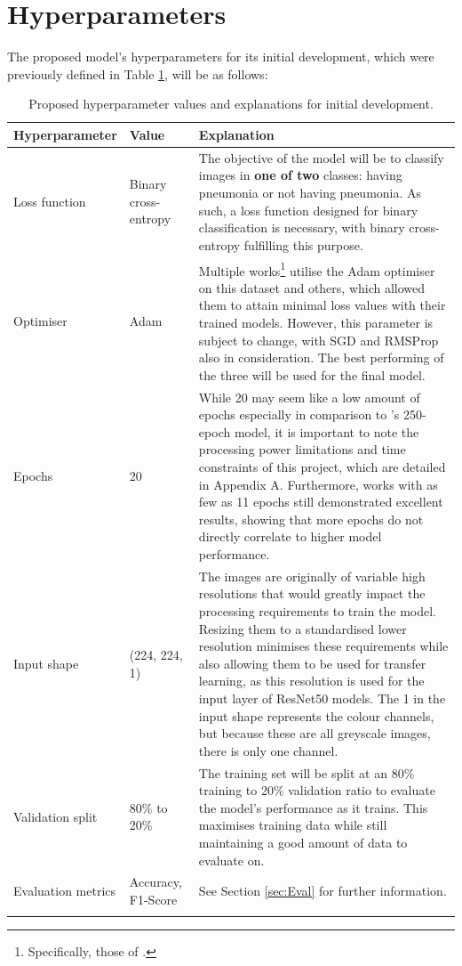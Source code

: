\documentclass[12pt]{report}
\begin{document}
\section{Hyperparameters}
The proposed model's hyperparameters for its initial development, which were previously defined in Table \ref{tab:Hyperparameters}, 
will be as follows:

\begin{longtable}{ | p{} | p{} | p{} | }
    \hline
    \cellcolor{blue!25} Hyperparameter & \cellcolor{blue!25} Value & \cellcolor{blue!25} Explanation \\
    \hline
    Loss function & Binary cross-entropy & The objective of the model will be to classify images in \textbf{one of two} classes: 
    having pneumonia or not having pneumonia. As such, a loss function designed for binary classification is necessary,
    with binary cross-entropy fulfilling this purpose. \\
    \hline
    Optimiser & Adam & Multiple works\footnote{Specifically, those of \textcite{malikCDC_NetMulticlassificationConvolutional2023a,elasnaouiDesignEnsembleDeep2021a}.} utilise the Adam optimiser on this dataset and others, which allowed them to attain 
    minimal loss values with their trained models. However, this parameter is subject to change, with SGD and RMSProp also in 
    consideration. The best performing of the three will be used for the final model. \\
    \hline 
    Epochs & 20 & While 20 may seem like a low amount of epochs especially in comparison to \textcite{elasnaouiDesignEnsembleDeep2021a}'s 
    250-epoch model, it is important to note the processing power limitations and time constraints of this project, 
    which are detailed in Appendix A. Furthermore, works with as few as 11 epochs \autocite{mathurPneumoniaDetectionUsing2020}
    still demonstrated excellent results, showing that more epochs do not directly correlate to higher model performance. \\
    \hline
    Input shape & (224, 224, 1) & The images are originally of variable high resolutions that would greatly impact the processing requirements 
    to train the model. Resizing them to a standardised lower resolution minimises these requirements while also allowing them to be used 
    for transfer learning, as this resolution is used for the input layer of ResNet50 models. The 1 in the input shape represents the 
    colour channels, but because these are all greyscale images, there is only one channel. \\
    \hline 
    Validation split & 80\% to 20\% & The training set will be split at an 80\% training to 20\% validation ratio to evaluate the model's 
    performance as it trains. This maximises training data while still maintaining a good amount of data to evaluate on. \\
    \hline 
    Evaluation metrics & Accuracy, F1-Score & See Section \ref{sec:Eval} for further information. \\
    \hline
    \caption{Proposed hyperparameter values and explanations for initial development.}\label{tab:Hyperparameters}
\end{longtable}
\end{document}
